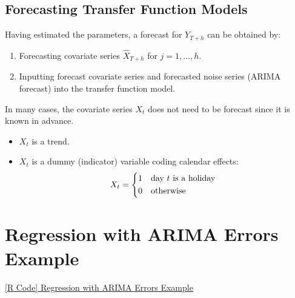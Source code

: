 \subsection*{Forecasting Transfer Function Models}
Having estimated the parameters, a forecast for $ Y_{T+h} $ can be obtained by:
\begin{enumerate}[(1)]
    \item Forecasting covariate series $ \hat{X}_{T+h} $ for $ j=1,\ldots,h $.
    \item Inputting forecast covariate series and forecasted noise series (ARIMA forecast)
          into the transfer function model.
\end{enumerate}
\begin{Remark}{}{}
    In many cases, the covariate series $ X_t $ does not need to be forecast since it is known in advance.
    \begin{Example}{}{}
        \begin{itemize}
            \item $ X_t $ is a trend.
            \item $ X_t $ is a dummy (indicator) variable coding calendar effects:
                  \[ X_t=\begin{cases*}
                          1 & day $ t $ is a holiday \\
                          0 & otherwise
                      \end{cases*} \]

        \end{itemize}
    \end{Example}
\end{Remark}

\section{Regression with ARIMA Errors Example}
\href{https://github.com/Hextical/university-notes/blob/master/year-3/semester-2/STAT%20443/code/12.3%20-%20Regression%20with%20ARIMA%20Errors%20Example.R}{[R Code] Regression with ARIMA Errors Example}

